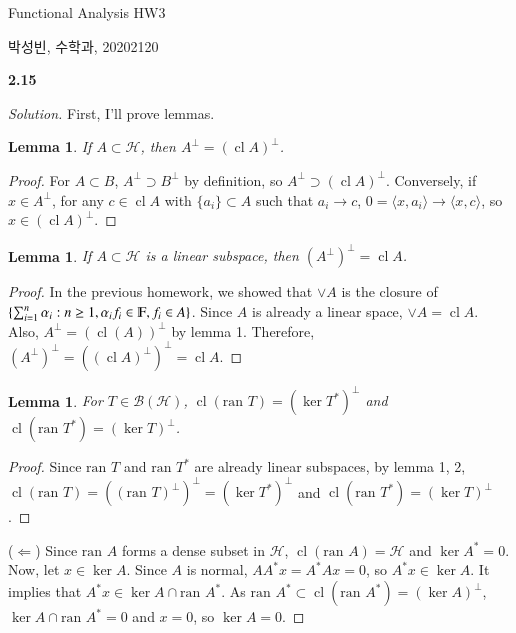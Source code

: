 \documentclass[a4paper, 12pt]{article}
\newcommand{\ran}{\textrm{ran }}
\theoremstyle{Mydefinition}
\theoremstyle{Mytheorem}
\newtheorem{lemma}[statement]{Lemma}
\DeclareMathOperator{\cl}{cl}
\begin{document}
\thispagestyle{myfirstpage}
\begin{center}
	\Large{Functional Analysis HW3}
\end{center}
박성빈, 수학과, 20202120

\noindent \textbf{2.15}

\begin{proof}[Solution]
First, I'll prove lemmas.
\begin{lemma}
If $A\subset \mathscr{H}$, then $A^\perp = (\cl A)^\perp$.
\end{lemma}

\begin{proof}
For $A\subset B$, $A^\perp\supset B^\perp$ by definition, so $A^\perp \supset (\cl A)^\perp$. Conversely, if $x\in A^\perp$, for any $c\in\cl A$ with $\{a_i\}\subset A$ such that $a_i\rightarrow c$, $0 = \langle x, a_i\rangle\rightarrow \langle x, c\rangle$, so $x\in (\cl A)^\perp$.
\end{proof}

\begin{lemma}
If $A \subset \mathscr{H}$ is a linear subspace, then $(A^\perp)^\perp = \cl A$.
\end{lemma}

\begin{proof}
In the previous homework, we showed that $\vee A$ is the closure of $\{\sum_{i=1}^n \alpha_i : n\geq 1, \alpha_i f_i\in \varmathbb{F}, f_i\in A\}$. Since $A$ is already a linear space, $\vee A = \cl A$. Also, $A^\perp = (\cl(A))^\perp$ by lemma 1. Therefore, $(A^\perp)^\perp = ((\cl A)^\perp)^\perp = \cl A$. 
\end{proof}

\begin{lemma}
For $T\in \mathscr{B}(\mathscr{H})$, $\cl(\ran T) = (\ker T^*)^\perp$ and $\cl(\ran T^*) = (\ker T)^\perp$.
\end{lemma}

\begin{proof}
Since $\ran T$ and $\ran T^*$ are already linear subspaces, by lemma 1, 2, $\cl(\ran T) = ((\ran T)^\perp)^\perp = (\ker T^*)^\perp$ and $\cl(\ran T^*) = (\ker T)^\perp$.
\end{proof}

($\Leftarrow$) Since $\ran A$ forms a dense subset in $\mathscr{H}$, $\cl(\ran A) = \mathscr{H}$ and $\ker A^* = 0$. Now, let $x\in \ker A$. Since $A$ is normal, $AA^* x = A^* A x = 0$, so $A^* x\in \ker A$. It implies that $A^*x \in \ker A \cap \ran A^*$. As $\ran A^* \subset \cl(\ran A^*) = (\ker A)^\perp$, $\ker A \cap \ran A^* = 0$ and $x = 0$, so $\ker A = 0$.


\end{proof}
\end{document}
